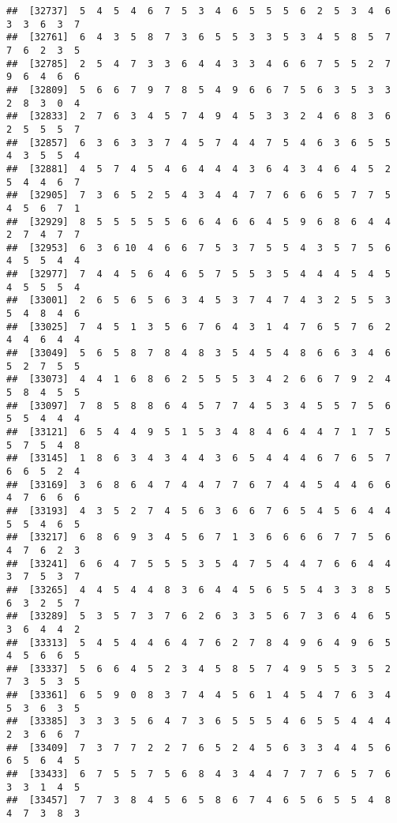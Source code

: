 \documentclass[
]{book}
\begin{document}
\begin{verbatim}
##  [32737]  5  4  5  4  6  7  5  3  4  6  5  5  5  6  2  5  3  4  6  3  3  6  3  7
##  [32761]  6  4  3  5  8  7  3  6  5  5  3  3  5  3  4  5  8  5  7  7  6  2  3  5
##  [32785]  2  5  4  7  3  3  6  4  4  3  3  4  6  6  7  5  5  2  7  9  6  4  6  6
##  [32809]  5  6  6  7  9  7  8  5  4  9  6  6  7  5  6  3  5  3  3  2  8  3  0  4
##  [32833]  2  7  6  3  4  5  7  4  9  4  5  3  3  2  4  6  8  3  6  2  5  5  5  7
##  [32857]  6  3  6  3  3  7  4  5  7  4  4  7  5  4  6  3  6  5  5  4  3  5  5  4
##  [32881]  4  5  7  4  5  4  6  4  4  4  3  6  4  3  4  6  4  5  2  5  4  4  6  7
##  [32905]  7  3  6  5  2  5  4  3  4  4  7  7  6  6  6  5  7  7  5  4  5  6  7  1
##  [32929]  8  5  5  5  5  5  6  6  4  6  6  4  5  9  6  8  6  4  4  2  7  4  7  7
##  [32953]  6  3  6 10  4  6  6  7  5  3  7  5  5  4  3  5  7  5  6  4  5  5  4  4
##  [32977]  7  4  4  5  6  4  6  5  7  5  5  3  5  4  4  4  5  4  5  4  5  5  5  4
##  [33001]  2  6  5  6  5  6  3  4  5  3  7  4  7  4  3  2  5  5  3  5  4  8  4  6
##  [33025]  7  4  5  1  3  5  6  7  6  4  3  1  4  7  6  5  7  6  2  4  4  6  4  4
##  [33049]  5  6  5  8  7  8  4  8  3  5  4  5  4  8  6  6  3  4  6  5  2  7  5  5
##  [33073]  4  4  1  6  8  6  2  5  5  5  3  4  2  6  6  7  9  2  4  5  8  4  5  5
##  [33097]  7  8  5  8  8  6  4  5  7  7  4  5  3  4  5  5  7  5  6  5  5  4  4  4
##  [33121]  6  5  4  4  9  5  1  5  3  4  8  4  6  4  4  7  1  7  5  5  7  5  4  8
##  [33145]  1  8  6  3  4  3  4  4  3  6  5  4  4  4  6  7  6  5  7  6  6  5  2  4
##  [33169]  3  6  8  6  4  7  4  4  7  7  6  7  4  4  5  4  4  6  6  4  7  6  6  6
##  [33193]  4  3  5  2  7  4  5  6  3  6  6  7  6  5  4  5  6  4  4  5  5  4  6  5
##  [33217]  6  8  6  9  3  4  5  6  7  1  3  6  6  6  6  7  7  5  6  4  7  6  2  3
##  [33241]  6  6  4  7  5  5  5  3  5  4  7  5  4  4  7  6  6  4  4  3  7  5  3  7
##  [33265]  4  4  5  4  4  8  3  6  4  4  5  6  5  5  4  3  3  8  5  6  3  2  5  7
##  [33289]  5  3  5  7  3  7  6  2  6  3  3  5  6  7  3  6  4  6  5  3  6  4  4  2
##  [33313]  5  4  5  4  4  6  4  7  6  2  7  8  4  9  6  4  9  6  5  4  5  6  6  5
##  [33337]  5  6  6  4  5  2  3  4  5  8  5  7  4  9  5  5  3  5  2  7  3  5  3  5
##  [33361]  6  5  9  0  8  3  7  4  4  5  6  1  4  5  4  7  6  3  4  5  3  6  3  5
##  [33385]  3  3  3  5  6  4  7  3  6  5  5  5  4  6  5  5  4  4  4  2  3  6  6  7
##  [33409]  7  3  7  7  2  2  7  6  5  2  4  5  6  3  3  4  4  5  6  6  5  6  4  5
##  [33433]  6  7  5  5  7  5  6  8  4  3  4  4  7  7  7  6  5  7  6  3  3  1  4  5
##  [33457]  7  7  3  8  4  5  6  5  8  6  7  4  6  5  6  5  5  4  8  4  7  3  8  3

\end{verbatim}
\end{document}
